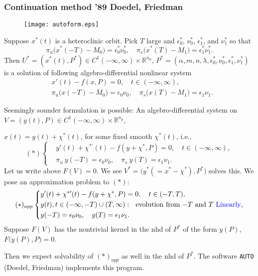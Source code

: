 \documentclass{beamer}
\def\blue{\color{blue}}
\begin{document}
\begin{frame}
 \frametitle{Continuation method '89 Doedel, Friedman}
 \begin{figure}
  \texttt{[image: autoform.eps]}
 \end{figure}
 {\scriptsize
 Suppose $x^*(t)$ is a heteroclinic orbit. Pick $T$ large and $\epsilon_0^*$, $\nu_0^*$, $\epsilon_1^*$, and $\nu_1^*$ so that
 $$\pi_u\big(x^*(-T)-M_0\big) = \epsilon_0^*\nu_0^*, \quad\pi_s\big(x^*(T)-M_1\big) = \epsilon_1^*\nu_1^*.$$
 Then $U^*= (x^*(t),P^*) \in C^1(-\infty,\infty) \times \mathbb{R}^{n_p}$, $P^*=(\alpha,m,n,\lambda, \epsilon_0^*,\nu_0^*,\epsilon_1^*,\nu_1^*)$ is a solution of following algebro-differential nonlinear system
 \begin{align*}
  &x'(t) - f(x,P) =0, \quad t\in (-\infty,\infty),\\
  &\pi_u\big(x(-T)-M_0\big) = \epsilon_0\nu_0, \quad\pi_s\big(x(T)-M_1\big) = \epsilon_1\nu_1.
 \end{align*}
 }
\end{frame}

\begin{frame}
 {\scriptsize
 Seemingly sounder formulation is possible: An algebro-differential system on $V= (y(t),P) \in C^1(-\infty,\infty) \times \mathbb{R}^{n_p}$, 
 
 $x(t) = y(t) +\chi^*(t)$, for some fixed smooth $\chi^*(t)$, i.e., %
 \begin{equation*}(*)\left\{
 \begin{aligned}
  &y'(t) +\chi^{*\prime}(t) - f(y+\chi^*,P) =0, \quad t\in (-\infty,\infty),\\
  &\pi_u~y(-T) = \epsilon_0\nu_0, \quad \pi_s~y(T) = \epsilon_1\nu_1.
 \end{aligned}\right.
 \end{equation*}
 Let us write above $F(V) = 0$. We see $V^*=\big(y^* (= x^*-\chi^*),P^*)$ solves this. 
 \pause
 We pose an approximation problem to $(*)$:
 \begin{equation*}(*)_{app}\left\{
 \begin{aligned}
  &y'(t) +\chi^{*\prime}(t) - f(y+\chi^*,P) =0, \quad t\in (-T,T),\\
  &y(t), t\in (-\infty,-T)\cup (T,\infty): ~~ \text{evolution from $-T$ and $T$ {\blue Linearly},}\\
  &y(-T) = \epsilon_0\nu_0, \quad y(T) = \epsilon_1\nu_1.
 \end{aligned}\right.
 \end{equation*}
 Suppose $F(V)$ has the nontrivial kernel in the nhd of $P^*$ of the form $y(P)$, $F\big(y(P),P\big)=0$.
 
 Then we expect solvability of $(*)_{app}$ as well in the nhd of $P^*$. The software \texttt{AUTO} (Doedel, Friedman) implements this program.
 } 
\end{frame}
\end{document}
